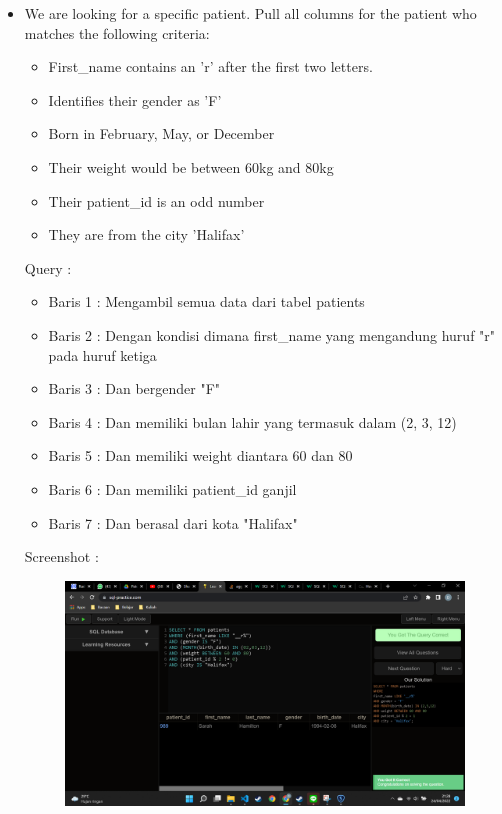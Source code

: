 \documentclass[]{article}
\begin{document}
\begin{itemize}
        \item We are looking for a specific patient. Pull all columns for the patient who matches the following criteria:
        \begin{itemize}
            \item First\_name contains an 'r' after the first two letters.
            \item Identifies their gender as 'F'
            \item Born in February, May, or December
            \item Their weight would be between 60kg and 80kg
            \item Their patient\_id is an odd number
            \item They are from the city 'Halifax'
        \end{itemize}
        Query :
        
        \begin{itemize}
            \item Baris 1 : Mengambil semua data dari tabel patients
            \item Baris 2 : Dengan kondisi dimana first\_name yang mengandung huruf "r" pada huruf ketiga
            \item Baris 3 : Dan bergender "F"
            \item Baris 4 : Dan memiliki bulan lahir yang termasuk dalam (2, 3, 12)
            \item Baris 5 : Dan memiliki weight diantara 60 dan 80
            \item Baris 6 : Dan memiliki patient\_id ganjil
            \item Baris 7 : Dan berasal dari kota "Halifax"
        \end{itemize}
        Screenshot :
        \begin{figure}[h]
            \includegraphics[scale=0.3]{./Screenshot/Hard-7.png}
            \centering
        \end{figure}


\end{itemize}
\end{document}
